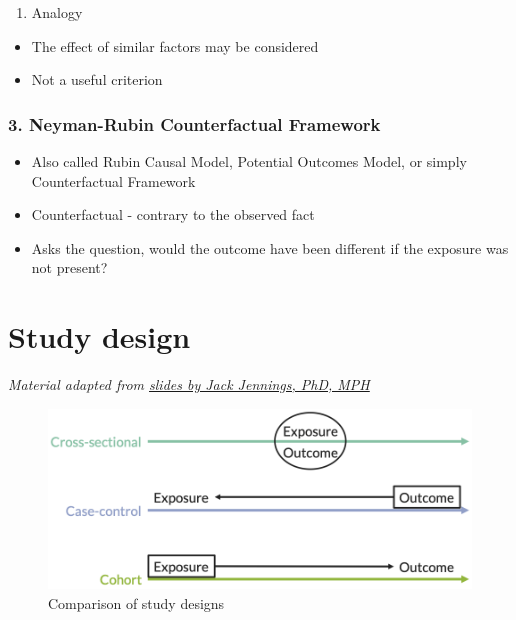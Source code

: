\documentclass[
]{book}
\providecommand{\tightlist}{%
  \setlength{\itemsep}{0pt}\setlength{\parskip}{0pt}}
\begin{document}
\begin{enumerate}
\def\labelenumi{\arabic{enumi}.}
\setcounter{enumi}{8}
\tightlist
\item
  Analogy
\end{enumerate}

\begin{itemize}
\tightlist
\item
  The effect of similar factors may be considered
\item
  Not a useful criterion
\end{itemize}

\hypertarget{neyman-rubin-counterfactual-framework}{%
\subsection{3. Neyman-Rubin Counterfactual Framework}\label{neyman-rubin-counterfactual-framework}}

\begin{itemize}
\tightlist
\item
  Also called Rubin Causal Model, Potential Outcomes Model, or simply Counterfactual Framework
\item
  Counterfactual - contrary to the observed fact
\item
  Asks the question, would the outcome have been different if the exposure was not present?
\end{itemize}

\hypertarget{study-design}{%
\chapter{Study design}\label{study-design}}

\emph{Material adapted from \href{https://www.hopkinsmedicine.org/gynecology_obstetrics/pdfs/medstudent/rtc2014/Epi\%20Study\%20Design\%20and\%20Exploratory\%20Analyses_abb.pdf}{slides by Jack Jennings, PhD, MPH}}

\begin{figure}

{\centering \includegraphics[width=1\linewidth]{img/study_design/study_design_schematic} 

}

\caption{Comparison of study designs}\label{fig:unnamed-chunk-5}
\end{figure}
\end{document}
